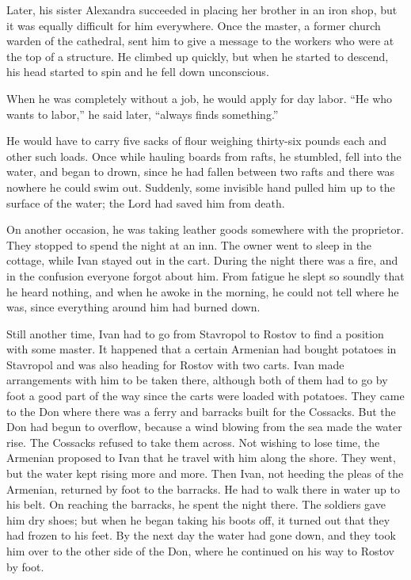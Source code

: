 Later, his sister Alexandra succeeded in placing her brother in an iron shop, but it was equally difficult for him everywhere. Once the master, a former church warden of the cathedral, sent him to give a message to the workers who were at the top of a structure. He climbed up quickly, but when he started to descend, his head started to spin and he fell down unconscious.

When he was completely without a job, he would apply for day labor. ``He who wants to labor,'' he said later, ``always finds something.''

He would have to carry five sacks of flour weighing thirty-six pounds each and other such loads. Once while hauling boards from rafts, he stumbled, fell into the water, and began to drown, since he had fallen between two rafts and there was nowhere he could swim out. Suddenly, some invisible hand pulled him up to the surface of the water; the Lord had saved him from death.

On another occasion, he was taking leather goods somewhere with the proprietor. They stopped to spend the night at an inn. The owner went to sleep in the cottage, while Ivan stayed out in the cart. During the night there was a fire, and in the confusion everyone forgot about him. From fatigue he slept so soundly that he heard nothing, and when he awoke in the morning, he could not tell where he was, since everything around him had burned down.

Still another time, Ivan had to go from Stavropol to Rostov to find a position with some master. It happened that a certain Armenian had bought potatoes in Stavropol and was also heading for Rostov with two carts. Ivan made arrangements with him to be taken there, although both of them had to go by foot a good part of the way since the carts were loaded with potatoes. They came to the Don where there was a ferry and barracks built for the Cossacks. But the Don had begun to overflow, because a wind blowing from the sea made the water rise. The Cossacks refused to take them across. Not wishing to lose time, the Armenian proposed to Ivan that he travel with him along the shore. They went, but the water kept rising more and more. Then Ivan, not heeding the pleas of the Armenian, returned by foot to the barracks. He had to walk there in water up to his belt. On reaching the barracks, he spent the night there. The soldiers gave him dry shoes; but when he began taking his boots off, it turned out that they had frozen to his feet. By the next day the water had gone down, and they took him over to the other side of the Don, where he continued on his way to Rostov by foot.

